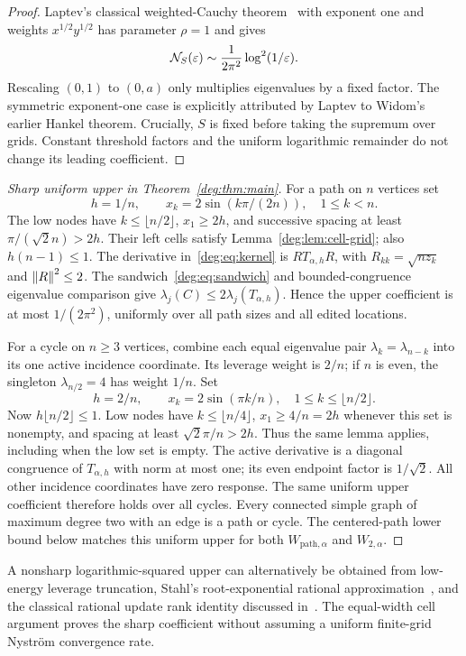 \begin{proof}
Laptev's classical weighted-Cauchy theorem~\cite[Theorem (3)]{Laptev}
with exponent one and weights $x^{1/2}y^{1/2}$ has parameter
$\rho=1$ and gives
\[
 \mathcal N_S(\varepsilon)\sim\frac1{2\pi^2}\log^2(1/\varepsilon).
\]
Rescaling $(0,1)$ to $(0,a)$ only multiplies eigenvalues by a fixed
factor. The symmetric exponent-one case is explicitly attributed by
Laptev to Widom's earlier Hankel theorem. Crucially, $S$ is fixed before
taking the supremum over grids. Constant threshold factors and the
uniform logarithmic remainder do not change its leading coefficient.
\end{proof}

\begin{proof}[Sharp uniform upper in Theorem~\ref{deg:thm:main}]
For a path on $n$ vertices set
\[
 h=1/n,\qquad x_k=2\sin(k\pi/(2n)),\quad1\le k<n.
\]
The low nodes have $k\le\lfloor n/2\rfloor$, $x_1\ge2h$, and
successive spacing at least $\pi/(\sqrt2n)>2h$.
Their left cells satisfy Lemma~\ref{deg:lem:cell-grid}; also
$h(n-1)\le1$. The derivative in~\eqref{deg:eq:kernel} is
$R T_{\alpha,h}R$, with $R_{kk}=\sqrt{nz_k}$ and $\left\lVert R\right\rVert^2\le2$.
The sandwich~\eqref{deg:eq:sandwich} and bounded-congruence eigenvalue
comparison give $\lambda_j(C)\le2\lambda_j(T_{\alpha,h})$.
Hence the upper coefficient is at most $1/(2\pi^2)$, uniformly over
all path sizes and all edited locations.

For a cycle on $n\ge3$ vertices, combine each equal eigenvalue pair
$\lambda_k=\lambda_{n-k}$ into its one active incidence coordinate.
Its leverage weight is $2/n$; if $n$ is even, the singleton
$\lambda_{n/2}=4$ has weight $1/n$.
Set
\[
 h=2/n,\qquad x_k=2\sin(\pi k/n),\quad
                       1\le k\le\lfloor n/2\rfloor.
\]
Now $h\lfloor n/2\rfloor\le1$. Low nodes have
$k\le\lfloor n/4\rfloor$, $x_1\ge4/n=2h$ whenever this set is nonempty,
and spacing at least $\sqrt2\pi/n>2h$.
Thus the same lemma applies, including when the low set is empty.
The active derivative is a diagonal congruence of $T_{\alpha,h}$
with norm at most one; its even endpoint factor is $1/\sqrt2$.
All other incidence coordinates have zero response.
The same uniform upper coefficient therefore holds over all cycles.
Every connected simple graph of maximum degree two with an edge is a
path or cycle. The centered-path lower bound below matches this uniform
upper for both $W_{\mathrm{path},\alpha}$ and $W_{2,\alpha}$.
\end{proof}

\begin{remark}
A nonsharp logarithmic-squared upper can alternatively be obtained from
low-energy leverage truncation, Stahl's root-exponential rational
approximation~\cite{Stahl}, and the classical rational update rank
identity discussed in~\cite[Section 3.3]{BCKS}.
The equal-width cell argument proves the sharp coefficient without
assuming a uniform finite-grid Nystr\"om convergence rate.
\end{remark}
